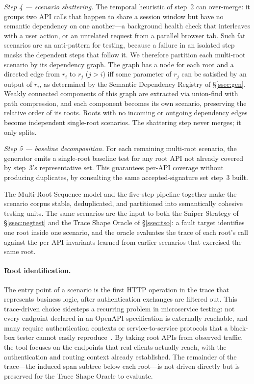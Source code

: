 \documentclass[conference]{IEEEtran}
\begin{document}
\emph{Step 4 --- scenario shattering.}
The temporal heuristic of step~2 can over-merge: it groups two API calls that happen to share a session window but have no semantic dependency on one another---a background health check that interleaves with a user action, or an unrelated request from a parallel browser tab. Such fat scenarios are an anti-pattern for testing, because a failure in an isolated step masks the dependent steps that follow it. We therefore partition each multi-root scenario by its dependency graph. The graph has a node for each root and a directed edge from $r_i$ to $r_j$ ($j > i$) iff some parameter of $r_j$ can be satisfied by an output of $r_i$, as determined by the Semantic Dependency Registry of \S\ref{ssec:gen}. Weakly connected components of this graph are extracted via union-find with path compression, and each component becomes its own scenario, preserving the relative order of its roots. Roots with no incoming or outgoing dependency edges become independent single-root scenarios. The shattering step never merges; it only splits.

\emph{Step 5 --- baseline decomposition.}
For each remaining multi-root scenario, the generator emits a single-root baseline test for any root API not already covered by step~3's representative set. This guarantees per-API coverage without producing duplicates, by consulting the same accepted-signature set step~3 built.

The Multi-Root Sequence model and the five-step pipeline together make the scenario corpus stable, deduplicated, and partitioned into semantically cohesive testing units. The same scenarios are the input to both the Sniper Strategy of \S\ref{ssec:negtest} and the Trace Shape Oracle of \S\ref{ssec:tso}: a fault target identifies one root inside one scenario, and the oracle evaluates the trace of each root's call against the per-API invariants learned from earlier scenarios that exercised the same root.

\paragraph{Root identification.}
The entry point of a scenario is the first HTTP operation in the trace that represents business logic, after authentication exchanges are filtered out. This trace-driven choice sidesteps a recurring problem in microservice testing: not every endpoint declared in an OpenAPI specification is externally reachable, and many require authentication contexts or service-to-service protocols that a black-box tester cannot easily reproduce~\cite{waseem2020testing,zhou2018microservice,microservice-testing-review-2023}. By taking root APIs from observed traffic, the tool focuses on the endpoints that real clients actually reach, with the authentication and routing context already established. The remainder of the trace---the induced span subtree below each root---is not driven directly but is preserved for the Trace Shape Oracle to evaluate.
\end{document}

